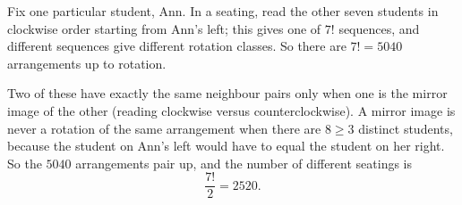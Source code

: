 Fix one particular student, Ann. In a seating, read the other seven students in clockwise order starting from Ann's left; this gives one of $7!$ sequences, and different sequences give different rotation classes. So there are $7!=5040$ arrangements up to rotation.

Two of these have exactly the same neighbour pairs only when one is the mirror image of the other (reading clockwise versus counterclockwise). A mirror image is never a rotation of the same arrangement when there are $8\ge3$ distinct students, because the student on Ann's left would have to equal the student on her right. So the $5040$ arrangements pair up, and the number of different seatings is
\[
\dfrac{7!}{2}=\boxed{2520}.
\]

